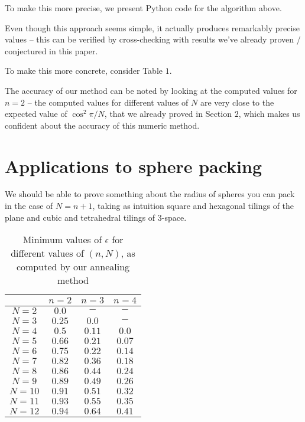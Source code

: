 \documentclass[11pt,letterpaper,twoside,english]{article}
\theoremstyle{theorem}
\theoremstyle{remark}
\begin{document}
To make this more precise, we present Python code for the algorithm above.

Even though this approach seems simple, it actually produces remarkably precise values -- this can be verified by cross-checking with results we've already proven / conjectured in this paper.

To make this more concrete, consider Table $1$.

The accuracy of our method can be noted by looking at the computed values for $n=2$ -- the computed values for different values of $N$ are very close to the expected value of $\cos^2 \pi/N$, that we already proved in Section $2$, which makes us confident about the accuracy of this numeric method.
\section{Applications to sphere packing}
We should be able to prove something about the radius of spheres you can pack in the case of $N=n+1$, taking as intuition square and hexagonal tilings of the plane and cubic and tetrahedral tilings of 3-space. 

\begin{table}
   \centering
    \begin{tabular}{ | c | c | c | c |}
    \hline
      & $n=2$ & $n=3$ & $n=4$ \\ \hline
    $N=2$ & $0.0$ & $-$ & $-$ \\ \hline
    $N=3$ & $0.25$ & $0.0$ & $-$ \\ \hline
    $N=4$ & $0.5$ & $0.11$ & $0.0$ \\ \hline
    $N=5$ & $0.66$ & $0.21$ & $0.07$ \\ \hline
    $N=6$ & $0.75$ & $0.22$ & $0.14$ \\ \hline
    $N=7$ & $0.82$ & $0.36$ & $0.18$ \\ \hline
    $N=8$ &  $0.86$ & $0.44$ & $0.24$ \\ \hline
    $N=9$ &  $0.89$ & $0.49$ & $0.26$ \\ \hline
    $N=10$ & $0.91$ & $0.51$ & $0.32$ \\ \hline
    $N=11$ & $0.93$  & $0.55$ & $0.35$ \\ \hline
    $N=12$ & $0.94$ & $0.64$ & $0.41$ \\
    \hline
    \end{tabular}
    \caption {Minimum values of $\epsilon$ for different values of $(n, N)$, as computed by our annealing method}
\end{table}
\end{document}
